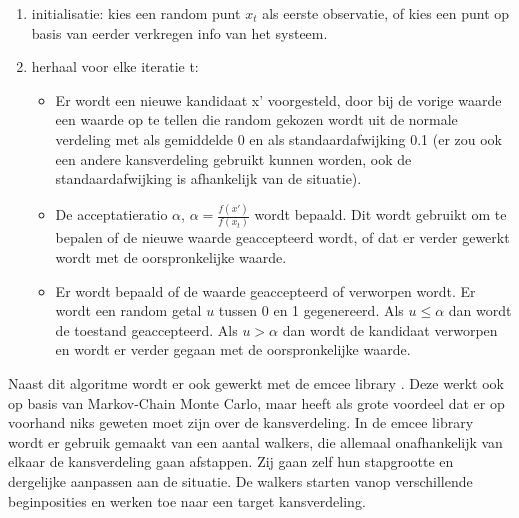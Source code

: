 \begin{enumerate}
    \item initialisatie: kies een random punt $x_{t}$ als eerste observatie, of kies een punt op basis van eerder verkregen info van het systeem.
    \item herhaal voor elke iteratie t:
    \begin{itemize}
        \item Er wordt een nieuwe kandidaat x' voorgesteld, door bij de vorige waarde een waarde op te tellen die random gekozen wordt uit de normale verdeling met als gemiddelde 0 en als standaardafwijking 0.1 (er zou ook een andere kansverdeling gebruikt kunnen worden, ook de standaardafwijking is afhankelijk van de situatie).
        \item De acceptatieratio $\alpha$, $\alpha=\frac{f(x')}{f(x_{t})}$ wordt bepaald. Dit wordt gebruikt om te bepalen of de nieuwe waarde geaccepteerd wordt, of dat er verder gewerkt wordt met de oorspronkelijke waarde. 
        \item Er wordt bepaald of de waarde geaccepteerd of verworpen wordt. Er wordt een random getal $u$ tussen 0 en 1 gegenereerd. Als $u\leq\alpha$ dan wordt de toestand geaccepteerd. Als $u>\alpha$ dan wordt de kandidaat verworpen en wordt er verder gegaan met de oorspronkelijke waarde.
    \end{itemize}
\end{enumerate}
Naast dit algoritme wordt er ook gewerkt met de emcee library \cite{unknown-author-no-date-emcee}. Deze werkt ook op basis van Markov-Chain Monte Carlo, maar heeft als grote voordeel dat er op voorhand niks geweten moet zijn over de kansverdeling. In de emcee library wordt er gebruik gemaakt van een aantal walkers, die allemaal onafhankelijk van elkaar de kansverdeling gaan afstappen. Zij gaan zelf hun stapgrootte en dergelijke aanpassen aan de situatie. De walkers starten vanop verschillende beginposities en werken toe naar een target kansverdeling. 











